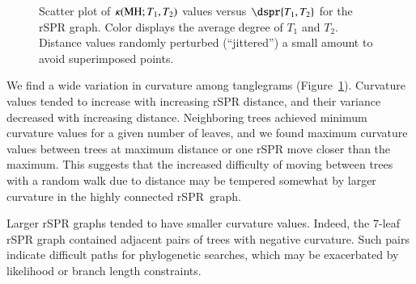 \documentclass[]{elsarticle}
\let\MYoriglatexcaption\caption
\renewcommand{\caption}[2][\relax]{\MYoriglatexcaption[#2]{#2}}
\newcommand{\MH}{\operatorname{MH}}
\newcommand{\curvature}[2][]{%
    \ifthenelse{\equal{#1}{}}%
		{\kappa(#2)}%
		{\kappa_{#1}(#2)}%
}
\begin{document}
\begin{figure}
    \caption{Scatter plot of $\curvature{\MH; T_1,T_2}$ values versus $\dspr{T_1,T_2}$ for the rSPR graph. Color displays the average degree of $T_1$ and $T_2$. Distance values randomly perturbed (``jittered'') a small amount to avoid superimposed points.}
	\label{fig:rspr-scatter}
\end{figure}

We find a wide variation in curvature among tanglegrams (Figure~\ref{fig:rspr-scatter}).
Curvature values tended to increase with increasing rSPR distance, and their variance decreased with increasing distance.
Neighboring trees achieved minimum curvature values for a given number of leaves, and we found maximum curvature values between trees at maximum distance or one rSPR move closer than the maximum.
This suggests that the increased difficulty of moving between trees with a random walk due to distance may be tempered somewhat by larger curvature in the highly connected rSPR~graph.

Larger rSPR graphs tended to have smaller curvature values.
Indeed, the 7-leaf rSPR graph contained adjacent pairs of trees with negative curvature.
Such pairs indicate difficult paths for phylogenetic searches, which may be exacerbated by likelihood or branch length constraints.
\end{document}
